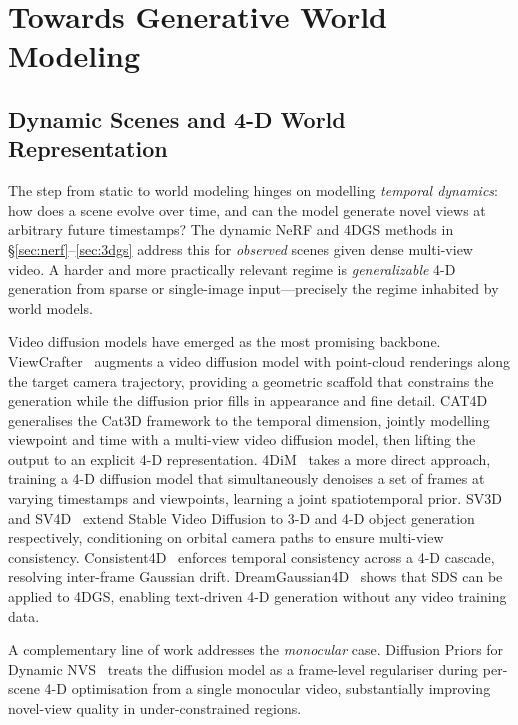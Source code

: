\section{Towards Generative World Modeling}
\label{sec:world}

\subsection{Dynamic Scenes and 4-D World Representation}

The step from static \nvs{} to world modeling hinges on modelling
\emph{temporal dynamics}: how does a scene evolve over time, and can
the model generate novel views at arbitrary future timestamps?
The dynamic NeRF and 4DGS methods in §\ref{sec:nerf}--\ref{sec:3dgs}
address this for \emph{observed} scenes given dense multi-view video.
A harder and more practically relevant regime is \emph{generalizable}
4-D generation from sparse or single-image input---precisely the regime
inhabited by world models.

Video diffusion models have emerged as the most promising backbone.
ViewCrafter~\citep{yu2024viewcrafter} augments a video diffusion model with
point-cloud renderings along the target camera trajectory, providing a
geometric scaffold that constrains the generation while the diffusion prior
fills in appearance and fine detail.
CAT4D~\citep{wu2024cat4d} generalises the Cat3D framework to the temporal
dimension, jointly modelling viewpoint and time with a multi-view video
diffusion model, then lifting the output to an explicit 4-D representation.
4DiM~\citep{watson2024_4dim} takes a more direct approach, training a
4-D diffusion model that simultaneously denoises a set of frames at
varying timestamps and viewpoints, learning a joint spatiotemporal prior.
SV3D~\citep{voleti2024sv3d} and SV4D~\citep{xie2024sv4d} extend Stable
Video Diffusion to 3-D and 4-D object generation respectively, conditioning
on orbital camera paths to ensure multi-view consistency.
Consistent4D~\citep{jiang2024consistent4d} enforces temporal consistency
across a 4-D cascade, resolving inter-frame Gaussian drift.
DreamGaussian4D~\citep{ren2023dreamgaussian4d} shows that SDS can be applied
to 4DGS, enabling text-driven 4-D generation without any video training data.

A complementary line of work addresses the \emph{monocular} case.
Diffusion Priors for Dynamic NVS~\citep{li2024diffpriordynamic} treats the
diffusion model as a frame-level regulariser during per-scene 4-D optimisation
from a single monocular video, substantially improving novel-view quality in
under-constrained regions.

